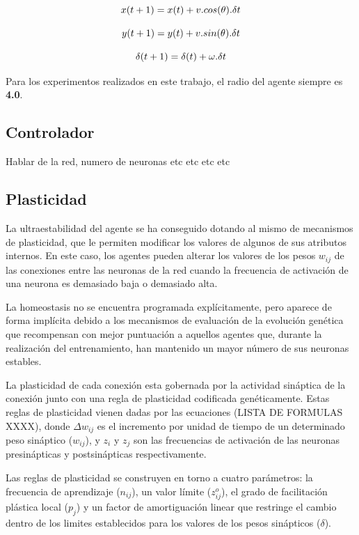 \begin{equation} \label{eq:newXformula}
 \centering
 x(t + 1) = x(t) + v.cos(\theta).\delta t
\end{equation}

\begin{equation} \label{eq:newYformula}
 \centering
 y(t + 1) = y(t) + v.sin(\theta).\delta t
\end{equation}

\begin{equation} \label{eq:newAformula}
 \centering
 \delta (t + 1) = \delta (t) + \omega .\delta t
\end{equation}

Para los experimentos realizados en este trabajo, el radio del agente siempre es \textbf{4.0}.

\subsection{Controlador}
Hablar de la red, numero de neuronas etc etc etc etc
\subsection{Plasticidad}
La ultraestabilidad del agente se ha conseguido dotando al mismo de mecanismos de plasticidad, que le permiten modificar los valores de algunos de sus atributos internos. En este caso, los agentes pueden
alterar los valores de los pesos $w_{ij}$ de las conexiones entre las neuronas de la red cuando la frecuencia de activación de una neurona es demasiado baja o demasiado alta.

La homeostasis no se encuentra programada explícitamente, pero aparece de forma implícita debido a los mecanismos de evaluación de la evolución genética que recompensan con mejor puntuación a aquellos
agentes que, durante la realización del entrenamiento, han mantenido un mayor número de sus neuronas estables.

La plasticidad de cada conexión esta gobernada por la actividad sináptica de la conexión junto con una regla de plasticidad codificada genéticamente. Estas reglas de plasticidad vienen dadas por las
ecuaciones (LISTA DE FORMULAS XXXX), donde $\Delta w_{ij}$ es el incremento por unidad de tiempo de un determinado peso sináptico ($w_{ij}$), y $z_{i}$ y $z_{j}$ son las frecuencias de
activación de las neuronas presinápticas y postsinápticas respectivamente.

Las reglas de plasticidad se construyen en torno a cuatro parámetros: la frecuencia de aprendizaje ($n_{ij}$), un valor límite ($z_{ij}^{o}$), el grado de facilitación plástica local ($p_{j}$) y
un factor de amortiguación linear que restringe el cambio dentro de los limites establecidos para los valores de los pesos sinápticos ($\delta$).

